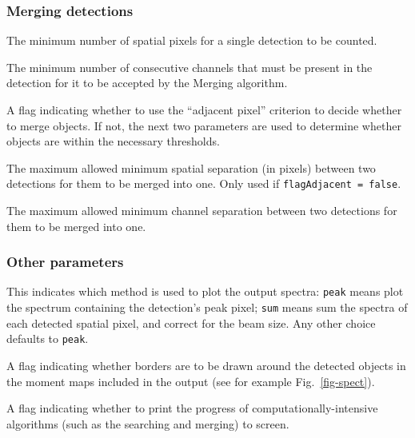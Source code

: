 \documentclass[12pt,a4paper]{article}
\newcommand{\entrylabel}[1]{\mbox{\textsf{\bf{#1:}}}\hfil}
\newenvironment{entry}
        {\begin{list}{}%
                {\renewcommand{\makelabel}{\entrylabel}%
                        \setlength{\labelwidth}{30mm}%
                        \setlength{\labelsep}{5pt}%
                        \setlength{\itemsep}{2pt}%
                        \setlength{\parsep}{2pt}%
                        \setlength{\leftmargin}{35mm}%
                }%
        }%
{\end{list}}
\begin{document}
\subsubsection*{Merging detections}
\begin{entry}
\item[minPix {\tt [2]}] The minimum number of spatial pixels for a single
  detection to be counted.
\item[minChannels {\tt [3]}] The minimum number of consecutive
  channels that must be present in the detection for it to be accepted
  by the Merging algorithm.
\item[flagAdjacent {\tt [true]}] A flag indicating whether to use the
  ``adjacent pixel'' criterion to decide whether to merge objects. If
  not, the next two parameters are used to determine whether objects
  are within the necessary thresholds.
\item[threshSpatial {\tt [3.]}] The maximum allowed minimum spatial
  separation (in pixels) between two detections for them to be merged
  into one. Only used if {\tt flagAdjacent = false}.
\item[threshVelocity {\tt [7.]}] The maximum allowed minimum channel
  separation between two detections for them to be merged into
  one. %
\end{entry}

\subsubsection*{Other parameters}
\begin{entry}
\item[spectralMethod {\tt [peak]}] This indicates which method is used
  to plot the output spectra: {\tt peak} means plot the spectrum
  containing the detection's peak pixel; {\tt sum} means sum the
  spectra of each detected spatial pixel, and correct for the beam
  size. Any other choice defaults to {\tt peak}.
\item[drawBorders {\tt [true]}] A flag indicating whether borders
  are to be drawn around the detected objects in the moment maps
  included in the output (see for example Fig.~\ref{fig-spect}).
\item[verbose {\tt [true]}] A flag indicating whether to print the
  progress of computationally-intensive algorithms (such as the
  searching and merging) to screen.
\end{entry}
\end{document}

